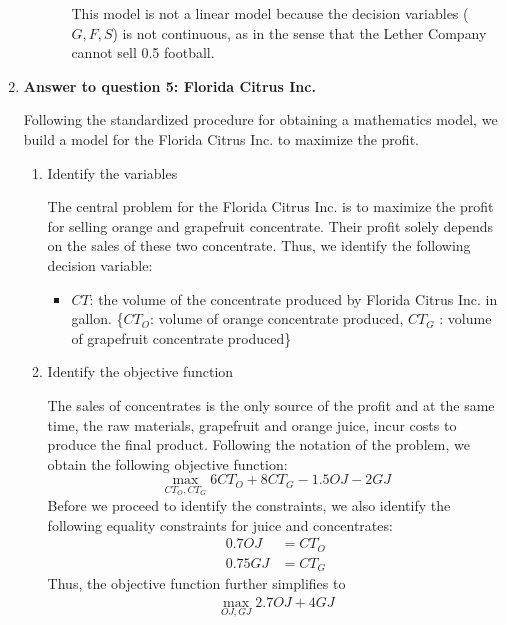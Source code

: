 \documentclass[11pt]{article}
\begin{document}
\begin{enumerate}
\begin{enumerate}
\begin{enumerate}
        This model is not a linear model because the decision variables ($G,F,S$) is not continuous, as in the sense that the Lether Company cannot sell 0.5 football. 
    \end{enumerate}
\end{enumerate}

\item \textbf{Answer to question 5: Florida Citrus Inc.} \par

Following the standardized procedure for obtaining a mathematics model, we build a model for the Florida Citrus Inc. to maximize the profit.

\renewcommand{\labelenumii}{{\arabic{enumii}}}
\begin{enumerate}
    \item Identify the variables\par
    The central problem for the Florida Citrus Inc. is to maximize the profit for selling orange and grapefruit concentrate. Their profit solely depends on the sales of these two concentrate. Thus, we identify the following decision variable:
    \begin{itemize}
        \item $CT$: the volume of the concentrate produced by Florida Citrus Inc. in gallon. \{$CT_O$: volume of orange concentrate produced, $CT_G$ : volume of grapefruit concentrate produced\}
    \end{itemize}
    \item Identify the objective function\par
    The sales of concentrates is the only source of the profit and at the same time, the raw materials, grapefruit and orange juice, incur costs to produce the final product. Following the notation of the problem, we obtain the following objective function:
    $$
    \max_{\mathit{CT_O}, \mathit{CT_G}} 6\mathit{CT_O} + 8\mathit{CT_G} - 1.5\mathit{OJ} - 2\mathit{GJ}
    $$
    Before we proceed to identify the constraints, we also identify the following equality constraints for juice and concentrates:
    \begin{align*}
        0.7 \mathit{OJ} &= \mathit{CT_O} \\
        0.75 \mathit{GJ} &= \mathit{CT_G}
    \end{align*}
    Thus, the objective function further simplifies to
    \begin{align*}
        \max_{\mathit{OJ}, \mathit{GJ}} 2.7\mathit{OJ} + 4\mathit{GJ}
    \end{align*}

\end{enumerate}
\end{enumerate}
\end{document}
